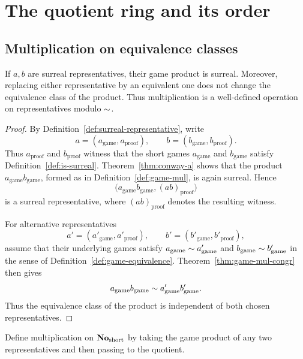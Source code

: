 \chapter{The quotient ring and its order}

\section{Multiplication on equivalence classes}

\begin{theorem}
  \label{thm:surreal-mul}
  \leanok
  If \(a,b\) are surreal representatives, their game product is surreal.  Moreover, replacing
  either representative by an equivalent one does not change the equivalence class of the
  product.  Thus multiplication is a well-defined operation on representatives modulo
  \(\sim\).
\end{theorem}
\begin{proof}
  \leanok
  By Definition~\ref{def:surreal-representative}, write
  \[
    a=(a_{\mathrm{game}},a_{\mathrm{proof}}),\qquad
    b=(b_{\mathrm{game}},b_{\mathrm{proof}}).
  \]
  Thus \(a_{\mathrm{proof}}\) and \(b_{\mathrm{proof}}\) witness that the short
  games \(a_{\mathrm{game}}\) and \(b_{\mathrm{game}}\) satisfy
  Definition~\ref{def:is-surreal}.  Theorem~\ref{thm:conway-a} shows that the
  product \(a_{\mathrm{game}}b_{\mathrm{game}}\), formed as in
  Definition~\ref{def:game-mul}, is again surreal.  Hence
  \[
    \bigl(a_{\mathrm{game}}b_{\mathrm{game}},(ab)_{\mathrm{proof}}\bigr)
  \]
  is a surreal representative, where \((ab)_{\mathrm{proof}}\) denotes the
  resulting witness.

  For alternative representatives
  \[
    a'=(a'_{\mathrm{game}},a'_{\mathrm{proof}}),\qquad
    b'=(b'_{\mathrm{game}},b'_{\mathrm{proof}}),
  \]
  assume that their underlying games satisfy
  \(a_{\mathrm{game}}\sim a'_{\mathrm{game}}\) and
  \(b_{\mathrm{game}}\sim b'_{\mathrm{game}}\) in the sense of
  Definition~\ref{def:game-equivalence}.  Theorem~\ref{thm:game-mul-congr}
  then gives
  \[
    a_{\mathrm{game}}b_{\mathrm{game}}
      \sim
    a'_{\mathrm{game}}b'_{\mathrm{game}}.
  \]
  Thus the equivalence class of the product is independent of both chosen
  representatives.
\end{proof}
\begin{definition}
  \label{def:surreal-number-mul}
  \leanok
  Define multiplication on \(\mathbf{No}_{\mathrm{short}}\) by taking the game product of any two representatives
  and then passing to the quotient.
\end{definition}

